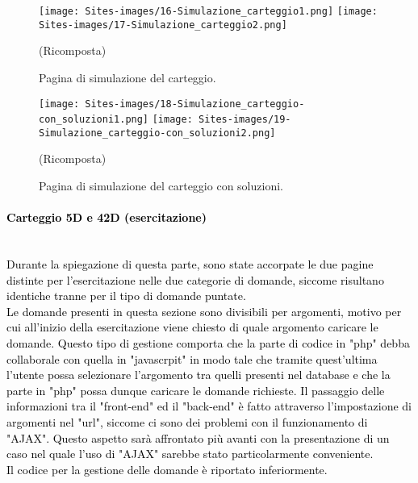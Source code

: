 \begin{minipage}{\textwidth}
	\begin{figure}[H]
		\begin{center}
			\texttt{[image: Sites-images/16-Simulazione\_carteggio1.png]}
			\texttt{[image: Sites-images/17-Simulazione\_carteggio2.png]}
			\caption{Pagina di simulazione del carteggio.}
			(Ricomposta)
		\end{center}
	\end{figure}
	
	\begin{figure}[H]
		\begin{center}
			\texttt{[image: Sites-images/18-Simulazione\_carteggio-con\_soluzioni1.png]}
			\texttt{[image: Sites-images/19-Simulazione\_carteggio-con\_soluzioni2.png]}
			\caption{Pagina di simulazione del carteggio con soluzioni.}
			(Ricomposta)
		\end{center}
	\end{figure}
\end{minipage}

\paragraph{\textcolor{black}{Carteggio 5D e 42D (esercitazione)}}\leavevmode\\
\textcolor{black}{Durante la spiegazione di questa parte, sono state accorpate le due pagine distinte per l'esercitazione nelle due categorie di domande, siccome risultano identiche tranne per il tipo di domande puntate.\\
Le domande presenti in questa sezione sono divisibili per argomenti, motivo per cui all'inizio della esercitazione viene chiesto di quale argomento caricare le domande. Questo tipo di gestione comporta che la parte di codice in "php" debba collaborale con quella in "javascrpit" in modo tale che tramite quest'ultima l'utente possa selezionare l'argomento tra quelli presenti nel database e che la parte in "php" possa dunque caricare le domande richieste. Il passaggio delle informazioni tra il "front-end" ed il "back-end" è fatto attraverso l'impostazione di argomenti nel "url", siccome ci sono dei problemi con il funzionamento di "AJAX". Questo aspetto sarà affrontato più avanti con la presentazione di un caso nel quale l'uso di "AJAX" sarebbe stato particolarmente conveniente.\\
Il codice per la gestione delle domande è riportato inferiormente.}\newline 

